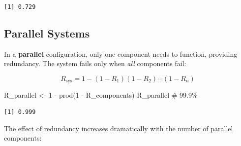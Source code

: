 \documentclass[
  letterpaper,
  DIV=11,
  numbers=noendperiod]{scrreprt}
\newenvironment{Shaded}{\begin{snugshade}}{\end{snugshade}}
\newcommand{\CommentTok}[1]{\textcolor[rgb]{0.37,0.37,0.37}{#1}}
\newcommand{\DecValTok}[1]{\textcolor[rgb]{0.68,0.00,0.00}{#1}}
\newcommand{\FunctionTok}[1]{\textcolor[rgb]{0.28,0.35,0.67}{#1}}
\newcommand{\NormalTok}[1]{\textcolor[rgb]{0.00,0.23,0.31}{#1}}
\newcommand{\OtherTok}[1]{\textcolor[rgb]{0.00,0.23,0.31}{#1}}
\newcommand{\SpecialCharTok}[1]{\textcolor[rgb]{0.37,0.37,0.37}{#1}}
\begin{document}
\begin{verbatim}
[1] 0.729
\end{verbatim}

\subsection{Parallel Systems}\label{parallel-systems}

In a \textbf{parallel} configuration, only one component needs to
function, providing redundancy. The system fails only when \emph{all}
components fail:

\[R_{\text{sys}} = 1 - (1 - R_1)(1 - R_2) \cdots (1 - R_n)\]

\begin{Shaded}
\begin{Highlighting}[]
\NormalTok{R\_parallel }\OtherTok{\textless{}{-}} \DecValTok{1} \SpecialCharTok{{-}} \FunctionTok{prod}\NormalTok{(}\DecValTok{1} \SpecialCharTok{{-}}\NormalTok{ R\_components)}
\NormalTok{R\_parallel  }\CommentTok{\# 99.9\%}
\end{Highlighting}
\end{Shaded}

\begin{verbatim}
[1] 0.999
\end{verbatim}

The effect of redundancy increases dramatically with the number of
parallel components:
\end{document}
